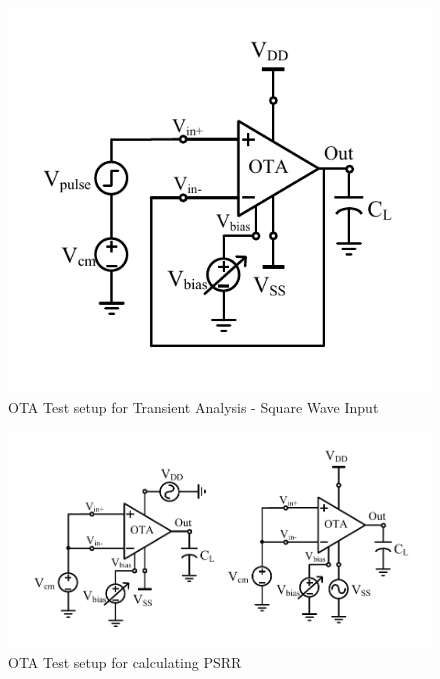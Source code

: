 \begin{figure} [H]
\centering
\includegraphics[scale=1]{Figures/Test_Benches/OTA/OTA_Slew.pdf}
\caption{OTA Test setup for Transient Analysis - Square Wave Input}
\end{figure}

\begin{figure} [H]
\centering
\includegraphics[scale=1]{Figures/Test_Benches/OTA/OTA_PSRR.pdf}
\caption{OTA Test setup for calculating PSRR}
\end{figure}

